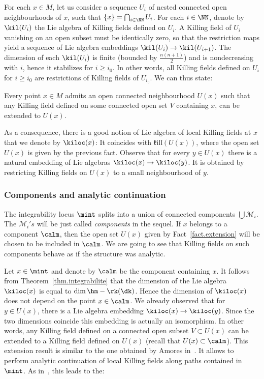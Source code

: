 For each $x \in M$, let us consider a sequence $U_i$ of nested connected open neighbourhoods of $x$, such that $\{ x \}=\bigcap_{i \in \NN}U_i$. For each $i \in \NN$, denote by $\kil(U_i)$ the Lie algebra of Killing fields defined on $U_i$. A Killing field of $U_i$ vanishing on an open subset must be identically zero, so that the restriction maps yield a sequence of Lie algebra embeddings $\kil(U_i) \to \kil(U_{i+1})$. The dimension of each $\kil(U_i)$ is finite (bounded by $\frac{n(n+1)}{2}$) and is nondecreasing with $i$, hence it stabilizes for $i \geq i_0$. In other words, all Killing fields defined on $U_i$ for $i \geq i_0$ are restrictions of Killing fields of $U_{i_0}$. We can thus state:
\begin{fact}\label{fact.extension}
Every point $x \in M$ admits an open connected neighbourhood $U(x)$ such that any Killing field defined on some connected open set $V$ containing $x$, can be extended to $U(x)$.
\end{fact}

As a consequence, there is a good notion of Lie algebra of local Killing fields at $x$ that we denote by $\kiloc(x)$: It coincides with $\mathfrak{kill}(U(x))$, where the open set $U(x)$ is given by the previous fact. Observe that for every $y \in U(x)$ there is a natural embedding of Lie algebras $\kiloc(x) \to \kiloc(y)$. It is obtained by restricting Killing fields on $U(x)$ to a small neighbourhood of $y$.


\subsubsection{Components and analytic continuation}\label{sec.analytic}
The integrability locus $\mint$ splits into a union of connected components $\bigcup {\mathcal M}_i$. The ${\mathcal M}_i's$ will be just called \emph{components} in the sequel. If $x$ belongs to a component $\calm$, then the open set $U(x)$ given by Fact~\ref{fact.extension} will be chosen to be included in $\calm$. We are going to see that Killing fields on such components behave as if the structure was analytic.


Let $x \in \mint$ and denote by $\calm$ be the component containing $x$. It follows from Theorem~\ref{thm.integrabilite} that the dimension of the Lie algebra $\kiloc(x)$ is equal to $\dim \hm - \rk(\dk)$. Hence the dimension of $\kiloc(x)$ does not depend on the point $x \in \calm$. We already observed that for $y \in U(x)$, there is a Lie algebra embedding $\kiloc(x) \to \kiloc(y)$. Since the two dimensions coincide this embedding is actually an isomorphism. In other words, any Killing field defined on a connected open subset $V \subset U(x)$ can be extended to a Killing field defined on $U(x)$ (recall that $U(x) \subset \calm$). This extension result is similar to the one obtained by Amores in~\cite{amores}. It allows to perform analytic continuation of local Killing fields along paths contained in $\mint$. As in~\cite{amores}, this leads to the:


